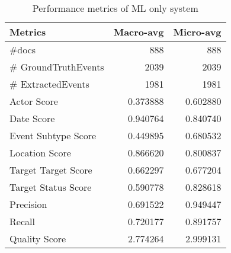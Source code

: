 \begin{table}
\centering
\begin{tabular}{l|r|r}
\toprule
             Metrics &    Macro-avg &    Micro-avg \\
\midrule
               \#docs &   888 &   888 \\
 \# GroundTruthEvents &  2039 &  2039 \\
   \# ExtractedEvents &  1981 &  1981 \\
         Actor Score &     0.373888 &     0.602880 \\
          Date Score &     0.940764 &     0.840740 \\
 Event Subtype Score &     0.449895 &     0.680532 \\
      Location Score &     0.866620 &     0.800837 \\
 Target Target Score &     0.662297 &     0.677204 \\
 Target Status Score &     0.590778 &     0.828618 \\
           Precision &     0.691522 &     0.949447 \\
              Recall &     0.720177 &     0.891757 \\
       Quality Score &     2.774264 &     2.999131 \\
\bottomrule
\end{tabular}
\caption{Performance metrics of ML only system}
\label{tab:mlPerformance}
\end{table}
